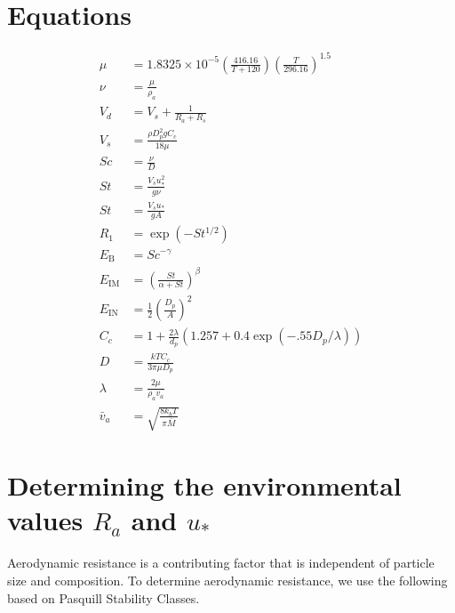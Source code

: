 \documentclass{article}
\begin{document}

\section{Equations}
\label{sec:equations}

\begin{align}
\mu & =  1.8325 \times 10^{-5}\left(\frac{416.16}{T + 120}\right)\left(\frac{T}{296.16}\right)^{1.5}\label{eq:dynamic_visc}\\
\nu & = \frac{\mu}{\rho_a}  \label{eq:kinematic_visc}\\
V_d &= V_s + \frac{1}{R_a + R_s} \label{eq:vd}\\
V_s & = \frac{\rho D_p^2gC_c}{18\mu } \label{eq:vs}\\
Sc &= \frac{\nu}{D}   \label{eq:sc} \\
St &= \frac{V_su_*^2}{g \nu } \label{eq:st_smooth}\\
St &= \frac{V_s u_*}{gA}  \label{eq:st_veg}\\
R_1 &= \exp(-St^{1/2}) \label{eq:R_1}\\
E_{\textrm{B}} &= Sc^{-\gamma}  \label{eq:eb}\\
E_{\textrm{IM}} & = \left(\frac{St}{\alpha + St}\right)^{\beta} \label{eq:eim}\\
E_{\textrm{IN}} &= \frac{1}{2} \left(\frac{D_p}{A}\right)^2 \label{eq:ein}\\
C_c & = 1 + \frac{2 \lambda}{d_p}\left(1.257 + 0.4\exp(-.55 D_p/\lambda)\right)  \label{eq:cc}\\ 
D & = \frac{kTC_c}{3 \pi \mu D_p}  \label{eq:brownian}\\
\lambda & = \frac{2 \mu}{\rho_a v_a} \label{eq:lambda}\\
\bar{v}_a & = \sqrt{\frac{8k_bT}{\pi\bar{M}}} \label{eq:thermal}
\end{align}

\section{Determining the environmental values $R_a$ and $u_*$}

Aerodynamic resistance is a contributing factor that is independent of particle size
and composition. To determine aerodynamic resistance, we use the following
based on Pasquill Stability Classes.
\end{document}

